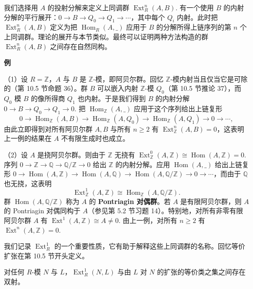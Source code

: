 我们选择用 \(A\) 的投射分解来定义上同调群 \(\operatorname{Ext}_R^n(A, B)\). 有一个使用 \(B\) 的内射分解的平行展开：\(0 \to B \to Q_0 \to Q_1 \to \cdots\)，其中每个 \(Q_i\) 内射。此时把 \(\operatorname{Ext}_R^n(A, B)\) 定义为把 \(\operatorname{Hom}_R(A, \_)\) 应用于 \(B\) 的分解所得上链序列的第 \(n\) 个上同调群。理论的展开与本节类似。最终可以证明两种方法构造的群 \(\operatorname{Ext}_R^n(A, B)\) 之间存在自然同构。

\noindent\textbf{例}

（1）设 \(R = \mathbb{Z}\)，\(A\) 与 \(B\) 是 \(\mathbb{Z}\)-模，即阿贝尔群。回忆 \(\mathbb{Z}\)-模内射当且仅当它是可除的（第 10.5 节命题 36）。群 \(B\) 可以嵌入内射 \(\mathbb{Z}\)-模 \(Q_0\)（第 10.5 节推论 37），而 \(Q_0\) 模 \(B\) 的像所得商 \(Q_1\) 也内射。于是我们得到 \(B\) 的内射分解 \(0 \to B \to Q_0 \to Q_1 \to 0\). 把 \(\operatorname{Hom}_{\mathbb{Z}}(A, \_)\) 应用于这个序列给出上链复形
\[
0 \to \operatorname{Hom}_{\mathbb{Z}}(A, B) \to \operatorname{Hom}_{\mathbb{Z}}(A, Q_0) \to \operatorname{Hom}_{\mathbb{Z}}(A, Q_1) \to 0 \to \cdots,
\]
由此立即得到对所有阿贝尔群 \(A, B\) 与所有 \(n \geq 2\) 有 \(\operatorname{Ext}_{\mathbb{Z}}^n(A, B) = 0\)，这表明上一例的结果在 \(A\) 不有限生成时也成立。

（2）设 \(A\) 是挠阿贝尔群。则由于 \(\mathbb{Z}\) 无挠有 \(\operatorname{Ext}_{\mathbb{Z}}^0(A, \mathbb{Z}) \cong \operatorname{Hom}(A, \mathbb{Z}) = 0\). 序列 \(0 \to \mathbb{Z} \to \mathbb{Q} \to \mathbb{Q}/\mathbb{Z} \to 0\) 给出 \(\mathbb{Z}\) 的内射分解。应用 \(\operatorname{Hom}(A, \_)\) 给出上链复形 \(0 \to \operatorname{Hom}(A, \mathbb{Z}) \to \operatorname{Hom}(A, \mathbb{Q}) \to \operatorname{Hom}(A, \mathbb{Q}/\mathbb{Z}) \to 0 \to \cdots\)，而由于 \(\mathbb{Q}\) 也无挠，这表明
\[
\operatorname{Ext}_{\mathbb{Z}}^1(A, \mathbb{Z}) \cong \operatorname{Hom}_{\mathbb{Z}}(A, \mathbb{Q}/\mathbb{Z}).
\]
群 \(\operatorname{Hom}(A, \mathbb{Q}/\mathbb{Z})\) 称为 \(A\) 的 \textbf{Pontriagin 对偶群}。若 \(A\) 是有限阿贝尔群，则 \(A\) 的 Pontriagin 对偶同构于 \(A\)（参见第 5.2 节习题 14）。特别地，对所有非零有限阿贝尔群 \(A\) 有 \(\operatorname{Ext}^1(A, \mathbb{Z}) \cong A \neq 0\). 由上一例，对所有 \(n \geq 2\) 有 \(\operatorname{Ext}^n(A, \mathbb{Z}) = 0\).

我们记录 \(\operatorname{Ext}_R^1\) 的一个重要性质，它有助于解释这些上同调群的名称。回忆等价扩张在第 10.5 节开头定义。

\begin{theorem}\label{thm:17.12}
对任何 \(R\)-模 \(N\) 与 \(L\)，\(\operatorname{Ext}_R^1(N, L)\) 与由 \(L\) 对 \(N\) 的扩张的等价类之集之间存在双射。
\end{theorem}

